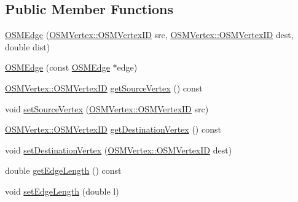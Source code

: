 \subsection*{Public Member Functions}
\begin{DoxyCompactItemize}
\item 
\mbox{\hyperlink{classbridges_1_1dataset_1_1_o_s_m_edge_a4b638a47d5cf8f1248d318b48bbbd5a0}{O\+S\+M\+Edge}} (\mbox{\hyperlink{classbridges_1_1dataset_1_1_o_s_m_vertex_ad166f13b0aefbdc05a273546f2a3bb96}{O\+S\+M\+Vertex\+::\+O\+S\+M\+Vertex\+ID}} src, \mbox{\hyperlink{classbridges_1_1dataset_1_1_o_s_m_vertex_ad166f13b0aefbdc05a273546f2a3bb96}{O\+S\+M\+Vertex\+::\+O\+S\+M\+Vertex\+ID}} dest, double dist)
\item 
\mbox{\hyperlink{classbridges_1_1dataset_1_1_o_s_m_edge_a8e412f87ed35e5667987de457e5609b6}{O\+S\+M\+Edge}} (const \mbox{\hyperlink{classbridges_1_1dataset_1_1_o_s_m_edge}{O\+S\+M\+Edge}} $\ast$edge)
\item 
\mbox{\hyperlink{classbridges_1_1dataset_1_1_o_s_m_vertex_ad166f13b0aefbdc05a273546f2a3bb96}{O\+S\+M\+Vertex\+::\+O\+S\+M\+Vertex\+ID}} \mbox{\hyperlink{classbridges_1_1dataset_1_1_o_s_m_edge_abe843416c79a4765a7ecb52d02283310}{get\+Source\+Vertex}} () const
\item 
void \mbox{\hyperlink{classbridges_1_1dataset_1_1_o_s_m_edge_ac34db39ff9ef47f69042e9d6ab577112}{set\+Source\+Vertex}} (\mbox{\hyperlink{classbridges_1_1dataset_1_1_o_s_m_vertex_ad166f13b0aefbdc05a273546f2a3bb96}{O\+S\+M\+Vertex\+::\+O\+S\+M\+Vertex\+ID}} src)
\item 
\mbox{\hyperlink{classbridges_1_1dataset_1_1_o_s_m_vertex_ad166f13b0aefbdc05a273546f2a3bb96}{O\+S\+M\+Vertex\+::\+O\+S\+M\+Vertex\+ID}} \mbox{\hyperlink{classbridges_1_1dataset_1_1_o_s_m_edge_ae9b23f06502688abd4ebc7b03abef7bc}{get\+Destination\+Vertex}} () const
\item 
void \mbox{\hyperlink{classbridges_1_1dataset_1_1_o_s_m_edge_a71868ae7357fc2aaa576e6befbbb0112}{set\+Destination\+Vertex}} (\mbox{\hyperlink{classbridges_1_1dataset_1_1_o_s_m_vertex_ad166f13b0aefbdc05a273546f2a3bb96}{O\+S\+M\+Vertex\+::\+O\+S\+M\+Vertex\+ID}} dest)
\item 
double \mbox{\hyperlink{classbridges_1_1dataset_1_1_o_s_m_edge_a4317cc9c09aa9a5108031185047cb399}{get\+Edge\+Length}} () const
\item 
void \mbox{\hyperlink{classbridges_1_1dataset_1_1_o_s_m_edge_a469d98f2239f245b43d3475cbc8c0e74}{set\+Edge\+Length}} (double l)
\end{DoxyCompactItemize}


